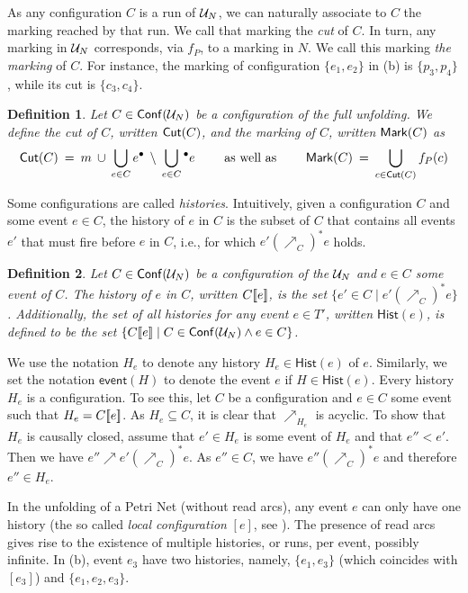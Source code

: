 \documentclass[11pt,a4paper]{article}
\newtheorem{definition}{Definition}
\newcommand{\event}[1]{\ensuremath{\mathsf{event}(#1)}}
\newcommand{\hist}[1]{\ensuremath{\mathsf{Hist}(#1)}}
\newcommand{\conf}[1]{\ensuremath{\mathsf{Conf}(#1)}}
\begin{document}
As any configuration $C$ is a run of $\mathcal{U}_{N}$, we can naturally associate to
$C$ the marking reached by that run.  We call that marking the \emph{cut} of
$C$.  In turn, any marking in $\mathcal{U}_{N}$ corresponds, via $f_P$, to a marking in
$N$.  We call this marking \emph{the marking} of $C$. For instance, the
marking of configuration $\{e_1, e_2\}$ in  (b) is $\{p_3,
p_4\}$, while its cut is $\{c_3, c_4\}$.

\begin{definition}
Let $C \in \conf{\unf N}$ be a configuration of the full unfolding.  We define
the \emph{cut} of $C$, written $\mathsf{Cut }{(C)}$, and the \emph{marking} of $C$, written
$\mathsf{Mark }{(C)}$ as $$\mathsf{Cut }{(C)} \: = \: m \: \cup \: \bigcup_{e \in C} e^\bullet \:
\setminus \: \bigcup_{e \in C} {}^\bullet e \qquad \mbox{ as well as } \qquad
\mathsf{Mark }{(C)} \: = \: \bigcup_{c \in \mathsf{Cut }{(C)}} f_P (c)$$
\end{definition}

Some configurations are called \emph{histories}.  Intuitively, given a
configuration $C$ and some event $e \in C$, the history of $e$ in $C$ is the
subset of $C$ that contains all events $e'$ that must fire before $e$ in $C$,
i.e., for which $e' (\nearrow_C)^* e$ holds.

\begin{definition}
Let $C \in \conf{\unf N}$ be a configuration of the $\mathcal{U}_{N}$ and $e \in C$ some
event of $C$.  The \emph{history} of $e$ in $C$, written $C [\![ e]\!]$, is the set
$\{e' \in C \mid e' (\nearrow_C)^* e\}$.  Additionally, the set of all
histories for any event $e \in T'$, written $\hist e$, is defined to be the set
$\{C \sem e \mid C \in \conf{\unf N} \land e \in C\}$.
\end{definition}

We use the notation $H_e$ to denote any history $H_e \in \hist e$ of $e$.
Similarly, we set the notation $\event H$ to denote the event $e$ if $H \in
\hist e$.  Every history $H_e$ is a configuration.  To see this, let $C$ be a
configuration and $e \in C$ some event such that $H_e = C [\![ e]\!]$.  As $H_e
\subseteq C$, it is clear that $\nearrow_{H_e}$ is acyclic.  To show that $H_e$
is causally closed, assume that $e' \in H_e$ is some event of $H_e$ and that
$e'' < e'$.  Then we have $e'' \nearrow e' (\nearrow_C)^* e$.  As $e'' \in C$,
we have $e'' (\nearrow_C)^* e$ and therefore $e'' \in H_e$.

In the unfolding of a Petri Net (without read arcs), any event $e$ can only
have one history (the so called \emph{local configuration} $[e]$, see
).  The presence of read arcs gives rise to the existence of
multiple histories, or runs, per event, possibly infinite.  In 
(b), event $e_3$ have two histories, namely, $\{e_1, e_3\}$ (which coincides
with $[e_3]$) and $\{e_1, e_2, e_3\}$.
\end{document}
